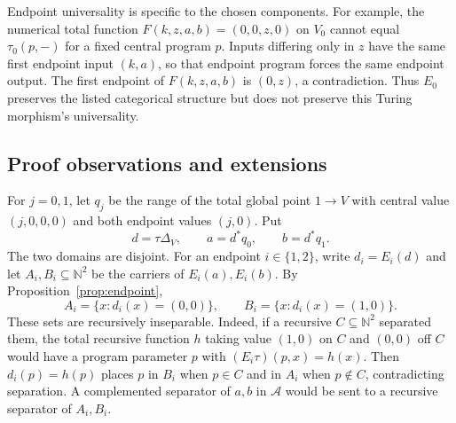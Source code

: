 \documentclass[11pt]{article}
\newcommand{\N}{\mathbb N}
\begin{document}
Endpoint universality is specific to the chosen components.
For example, the numerical total function
$F(k,z,a,b)=(0,0,z,0)$ on $V_0$ cannot equal
$\tau_0(p,-)$ for a fixed central program $p$.
Inputs differing only in $z$ have the same first endpoint input
$(k,a)$, so that endpoint program forces the same endpoint output.
The first endpoint of $F(k,z,a,b)$ is $(0,z)$, a contradiction.
Thus $E_0$ preserves the listed categorical structure but does
not preserve this Turing morphism's universality.

\subsection{Proof observations and extensions}

For $j=0,1$, let $q_j$ be the range of the total global point $1\to V$
with central value $(j,0,0,0)$ and both endpoint values $(j,0)$.
Put
\[
 d=\tau\Delta_V,\qquad a=d^*q_0,\qquad b=d^*q_1.
\]
The two domains are disjoint. For an endpoint $i\in\{1,2\}$,
write $d_i=E_i(d)$ and let $A_i,B_i\subseteq\N^2$ be the
carriers of $E_i(a),E_i(b)$. By Proposition~\ref{prop:endpoint},
\[
 A_i=\{x:d_i(x)=(0,0)\},\qquad
 B_i=\{x:d_i(x)=(1,0)\}.
\]
These sets are recursively inseparable. Indeed, if a recursive
$C\subseteq\N^2$ separated them, the total recursive function
$h$ taking value $(1,0)$ on $C$ and $(0,0)$ off $C$ would have
a program parameter $p$ with $(E_i\tau)(p,x)=h(x)$.
Then $d_i(p)=h(p)$ places $p$ in $B_i$ when $p\in C$
and in $A_i$ when $p\notin C$, contradicting separation.
A complemented separator of $a,b$ in $\mathcal A$ would be
sent to a recursive separator of $A_i,B_i$.
\end{document}
